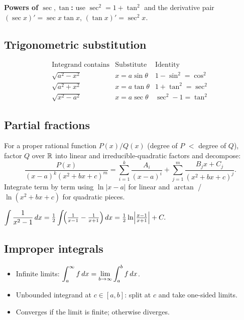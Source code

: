 \textbf{Powers of $\sec, \tan$:} use $\sec^2 = 1 + \tan^2$ and the derivative pair
$(\sec x)' = \sec x \tan x$, $(\tan x)' = \sec^2 x$.

\subsection{Trigonometric substitution}
\[
\renewcommand{\arraystretch}{1.3}
\begin{array}{l|l|l}
\text{Integrand contains} & \text{Substitute} & \text{Identity} \\\hline
\sqrt{a^2 - x^2} & x = a \sin \theta & 1 - \sin^2 = \cos^2 \\
\sqrt{a^2 + x^2} & x = a \tan \theta & 1 + \tan^2 = \sec^2 \\
\sqrt{x^2 - a^2} & x = a \sec \theta & \sec^2 - 1 = \tan^2
\end{array}
\]

\subsection{Partial fractions}
For a proper rational function $P(x)/Q(x)$ (degree of $P$ $<$ degree of $Q$),
factor $Q$ over $\mathbb{R}$ into linear and irreducible-quadratic factors and decompose:
\[ \frac{P(x)}{(x-a)^k (x^2 + bx + c)^m} = \sum_{i=1}^k \frac{A_i}{(x-a)^i} + \sum_{j=1}^m \frac{B_j x + C_j}{(x^2 + bx + c)^j}. \]
Integrate term by term using $\ln|x-a|$ for linear and $\arctan$ / $\ln(x^2 + bx + c)$
for quadratic pieces.

\begin{example}
$\displaystyle \int \frac{1}{x^2 - 1} \,dx = \tfrac{1}{2} \int \!\Bigl(\tfrac{1}{x-1} - \tfrac{1}{x+1}\Bigr)\,dx
= \tfrac{1}{2} \ln\!\left|\tfrac{x-1}{x+1}\right| + C.$
\end{example}

\subsection{Improper integrals}
\begin{itemize}[leftmargin=*,nosep]
  \item Infinite limits: $\displaystyle \int_a^\infty f \,dx = \lim_{b\to\infty} \int_a^b f \,dx$.
  \item Unbounded integrand at $c \in [a,b]$: split at $c$ and take one-sided limits.
  \item Converges if the limit is finite; otherwise diverges.
\end{itemize}

